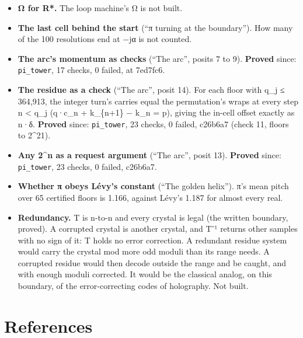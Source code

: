 \begin{itemize}
\item \textbf{Ω for R*.} The loop machine's Ω is not built.
\item \textbf{The last cell behind the start} (“π turning at the boundary”). How many of the 100 resolutions end at −jα is not counted.
\item \textbf{The arc's momentum as checks} (“The arc”, posits 7 to 9). \textbf{Proved} since: \texttt{pi\_\allowbreak{}tower}, 17 checks, 0 failed, at 7ed7fc6.
\item \textbf{The residue as a check} (“The arc”, posit 14). For each floor with q\_\allowbreak{}j ≤ 364,913, the integer turn's carries equal the permutation's wraps at every step n < q\_\allowbreak{}j (q·c\_\allowbreak{}n + k\_\allowbreak{}\{n+1\} − k\_\allowbreak{}n = p), giving the in-cell offset exactly as n·δ. \textbf{Proved} since: \texttt{pi\_\allowbreak{}tower}, 23 checks, 0 failed, c26b6a7 (check 11, floors to 2\textasciicircum{}21).
\item \textbf{Any 2\textasciicircum{}n as a request argument} (“The arc”, posit 13). \textbf{Proved} since: \texttt{pi\_\allowbreak{}tower}, 23 checks, 0 failed, c26b6a7.
\item \textbf{Whether π obeys Lévy's constant} (“The golden helix”). π's mean pitch over 65 certified floors is 1.166, against Lévy's 1.187 for almost every real.
\item \textbf{Redundancy.} T is n-to-n and every crystal is legal (the written boundary, proved). A corrupted crystal is another crystal, and T⁻¹ returns other samples with no sign of it: T holds no error correction. A redundant residue system would carry the crystal mod more odd moduli than its range needs. A corrupted residue would then decode outside the range and be caught, and with enough moduli corrected. It would be the classical analog, on this boundary, of the error-correcting codes of holography. Not built.
\end{itemize}

\section{\texorpdfstring{References}{References}}

